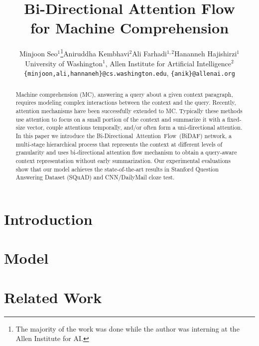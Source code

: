 \documentclass{article} %
\title{Bi-Directional Attention Flow \\
for Machine Comprehension}
\author{Minjoon Seo$^1$\thanks{The majority of the work was done while the author was interning at the Allen Institute for AI.}\qquad Aniruddha Kembhavi$^2$\qquad Ali Farhadi$^{1,2}$\qquad Hananneh Hajishirzi$^1$ \\
University of Washington$^1$, Allen Institute for Artificial Intelligence$^2$\\
\texttt{\{minjoon,ali,hannaneh\}@cs.washington.edu}, \texttt{\{anik\}@allenai.org}\\
}
\newcommand{\sys}{\mbox{Bi-Directional Attention Flow}}
\newcommand{\sysshort}{\mbox{\sc BiDAF}}
\begin{document}
\maketitle

\begin{abstract}
Machine comprehension (MC), answering a query about a given context paragraph, requires modeling complex interactions between the context and the query. Recently, attention mechanisms have been successfully extended to MC. Typically these methods use attention to focus on a small portion of the context and summarize it with a fixed-size vector, couple attentions temporally, and/or often form a uni-directional attention. 
In this paper we introduce the \sys\ (\sysshort) network, a multi-stage hierarchical process that represents the context at different levels of granularity and uses bi-directional attention flow mechanism to obtain a query-aware context representation without early summarization. 
Our experimental evaluations show that our  model achieves the state-of-the-art results in Stanford Question Answering Dataset (SQuAD) and CNN/DailyMail cloze test. 

\end{abstract}

\section{Introduction}\label{sec:intro}



\section{Model}\label{sec:model}


\section{Related Work}\label{sec:related}

\end{document}
